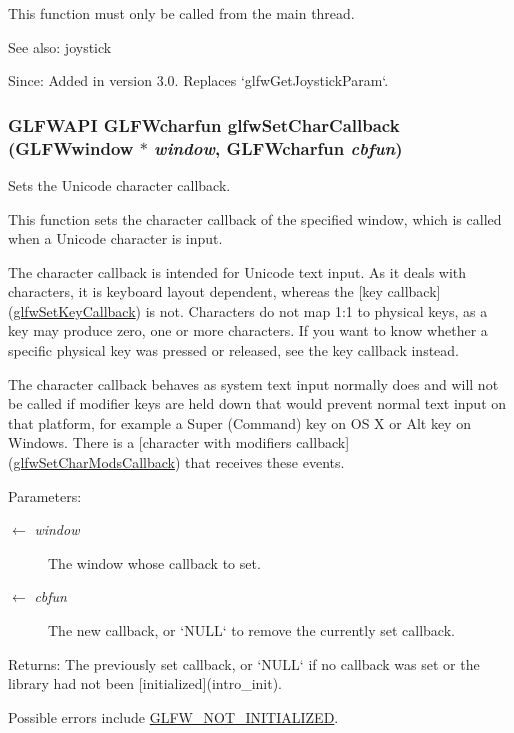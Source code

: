 This function must only be called from the main thread.

\begin{Desc}
\item[See also:]joystick\end{Desc}
\begin{Desc}
\item[Since:]Added in version 3.0. Replaces `glfwGetJoystickParam`. \end{Desc}
\hypertarget{group__input_g07b2959b23dc3e466ce7475746021002}{
\subsubsection[glfwSetCharCallback]{\setlength{\rightskip}{0pt plus 5cm}GLFWAPI {\bf GLFWcharfun} glfwSetCharCallback ({\bf GLFWwindow} $\ast$ {\em window}, \/  {\bf GLFWcharfun} {\em cbfun})}}
\label{group__input_g07b2959b23dc3e466ce7475746021002}


Sets the Unicode character callback. 

This function sets the character callback of the specified window, which is called when a Unicode character is input.

The character callback is intended for Unicode text input. As it deals with characters, it is keyboard layout dependent, whereas the \mbox{[}key callback\mbox{]}(\hyperlink{group__input_ga73bb92f628a2a0be9c132d56f19362c}{glfwSetKeyCallback}) is not. Characters do not map 1:1 to physical keys, as a key may produce zero, one or more characters. If you want to know whether a specific physical key was pressed or released, see the key callback instead.

The character callback behaves as system text input normally does and will not be called if modifier keys are held down that would prevent normal text input on that platform, for example a Super (Command) key on OS X or Alt key on Windows. There is a \mbox{[}character with modifiers callback\mbox{]}(\hyperlink{group__input_ge6eee0bda7429bfe8028615847cf6795}{glfwSetCharModsCallback}) that receives these events.

\begin{Desc}
\item[Parameters:]
\begin{description}
\item[\mbox{$\leftarrow$} {\em window}]The window whose callback to set. \item[\mbox{$\leftarrow$} {\em cbfun}]The new callback, or `NULL` to remove the currently set callback. \end{description}
\end{Desc}
\begin{Desc}
\item[Returns:]The previously set callback, or `NULL` if no callback was set or the library had not been \mbox{[}initialized\mbox{]}(intro\_\-init).\end{Desc}
Possible errors include \hyperlink{group__errors_g2374ee02c177f12e1fa76ff3ed15e14a}{GLFW\_\-NOT\_\-INITIALIZED}.

